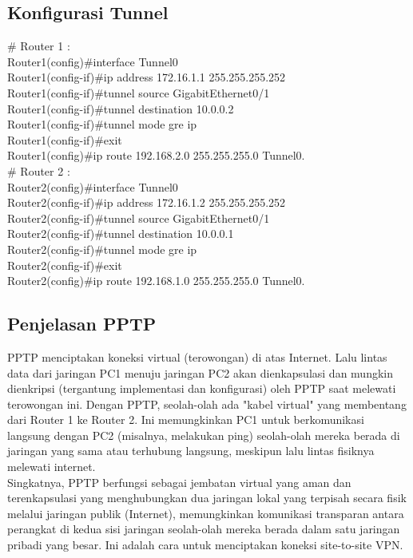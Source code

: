\subsection{Konfigurasi Tunnel}
\# Router 1 : \\ 
Router1(config)\#interface Tunnel0 \\
Router1(config-if)\#ip address 172.16.1.1 255.255.255.252 \\
Router1(config-if)\#tunnel source GigabitEthernet0/1 \\
Router1(config-if)\#tunnel destination 10.0.0.2 \\
Router1(config-if)\#tunnel mode gre ip \\
Router1(config-if)\#exit \\
Router1(config)\#ip route 192.168.2.0 255.255.255.0 Tunnel0. \\
\# Router 2 : \\
Router2(config)\#interface Tunnel0 \\
Router2(config-if)\#ip address 172.16.1.2 255.255.255.252 \\
Router2(config-if)\#tunnel source GigabitEthernet0/1 \\
Router2(config-if)\#tunnel destination 10.0.0.1 \\
Router2(config-if)\#tunnel mode gre ip \\
Router2(config-if)\#exit \\ 
Router2(config)\#ip route 192.168.1.0 255.255.255.0 Tunnel0.
\subsection{Penjelasan PPTP}
PPTP menciptakan koneksi virtual (terowongan) di atas Internet. Lalu lintas data dari jaringan PC1 menuju jaringan PC2 akan dienkapsulasi dan mungkin dienkripsi (tergantung implementasi dan konfigurasi) oleh PPTP saat melewati terowongan ini. Dengan PPTP, seolah-olah ada "kabel virtual" yang membentang dari Router 1 ke Router 2. Ini memungkinkan PC1 untuk berkomunikasi langsung dengan PC2 (misalnya, melakukan ping) seolah-olah mereka berada di jaringan yang sama atau terhubung langsung, meskipun lalu lintas fisiknya melewati internet. \\ Singkatnya, PPTP berfungsi sebagai jembatan virtual yang aman dan terenkapsulasi yang menghubungkan dua jaringan lokal yang terpisah secara fisik melalui jaringan publik (Internet), memungkinkan komunikasi transparan antara perangkat di kedua sisi jaringan seolah-olah mereka berada dalam satu jaringan pribadi yang besar. Ini adalah cara untuk menciptakan koneksi site-to-site VPN.
